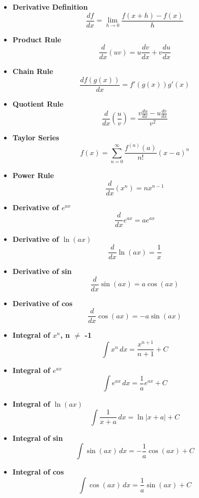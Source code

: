 \documentclass[a4paper, 11pt]{book}
\begin{document}
\begin{multicols}{2}
\begin{itemize}
\item \textbf{Derivative Definition}
      \[\frac{df}{dx} = \lim_{h\to 0}\frac{f(x+h)-f(x)}{h}\]

\item \textbf{Product Rule}
      \[\frac{d}{dx}(uv) = u\frac{dv}{dx} + v\frac{du}{dx}\]

\item \textbf{Chain Rule}
      \[\frac{df(g(x))}{dx} = f'(g(x))g'(x)\]

\item \textbf{Quotient Rule}
      \[\frac{d}{dx}\left(\frac{u}{v}\right) = \frac{v\frac{du}{dx} - u\frac{dv}{dx}}{v^2}\]

\item \textbf{Taylor Series}
      \[f(x) = \sum_{n=0}^\infty \frac{f^{(n)}(a)}{n!}(x-a)^n\]

\item \textbf{Power Rule}
      \[\frac{d}{dx}(x^n) = nx^{n-1}\]

\item \textbf{Derivative of $e^{ax}$}
      \[\frac{d}{dx}e^{ax} = ae^{ax}\]

\item \textbf{Derivative of $\ln(ax)$}
      \[\frac{d}{dx}\ln(ax) = \frac{1}{x}\]

\item \textbf{Derivative of sin}
      \[\frac{d}{dx}\sin(ax) = a\cos(ax)\]

\item \textbf{Derivative of cos}
      \[\frac{d}{dx}\cos(ax) = -a\sin(ax)\]

\item \textbf{Integral of $x^n$, n $\neq$ -1}
      \[\int x^n \,dx = \frac{x^{n+1}}{n+1} + C\]

\item \textbf{Integral of $e^{ax}$}
      \[\int e^{ax} \,dx = \frac{1}{a}e^{ax} + C\]

\item \textbf{Integral of $\ln(ax)$}
      \[\int \frac{1}{x+a} \,dx = \ln|x+a| + C\]

\item \textbf{Integral of sin}
      \[\int \sin(ax) \,dx = -\frac{1}{a}\cos(ax) + C\]

\item \textbf{Integral of cos}
      \[\int \cos(ax) \,dx = \frac{1}{a}\sin(ax) + C\]


\end{itemize}
\end{multicols}
\end{document}
